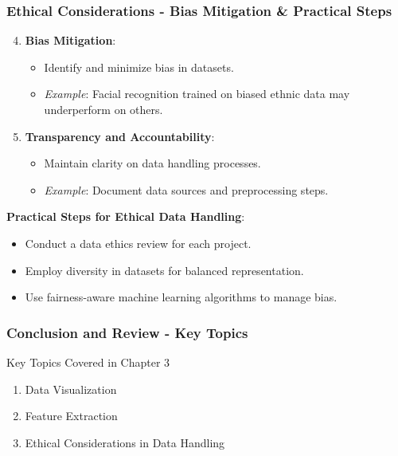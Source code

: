 \documentclass[aspectratio=169]{beamer}
\begin{document}
\begin{frame}[fragile]
    \frametitle{Ethical Considerations - Bias Mitigation & Practical Steps}
    \begin{enumerate}
        \setcounter{enumi}{3}
        \item \textbf{Bias Mitigation}:
            \begin{itemize}
                \item Identify and minimize bias in datasets.
                \item \textit{Example}: Facial recognition trained on biased ethnic data may underperform on others.
            \end{itemize}
            
        \item \textbf{Transparency and Accountability}:
            \begin{itemize}
                \item Maintain clarity on data handling processes.
                \item \textit{Example}: Document data sources and preprocessing steps.
            \end{itemize}
    \end{enumerate}

    \textbf{Practical Steps for Ethical Data Handling}:
    \begin{itemize}
        \item Conduct a data ethics review for each project.
        \item Employ diversity in datasets for balanced representation.
        \item Use fairness-aware machine learning algorithms to manage bias.
    \end{itemize}
\end{frame}

\begin{frame}[fragile]
    \frametitle{Conclusion and Review - Key Topics}
    \begin{block}{Key Topics Covered in Chapter 3}
        \begin{enumerate}
            \item Data Visualization
            \item Feature Extraction
            \item Ethical Considerations in Data Handling
        \end{enumerate}
    \end{block}
\end{frame}
\end{document}
